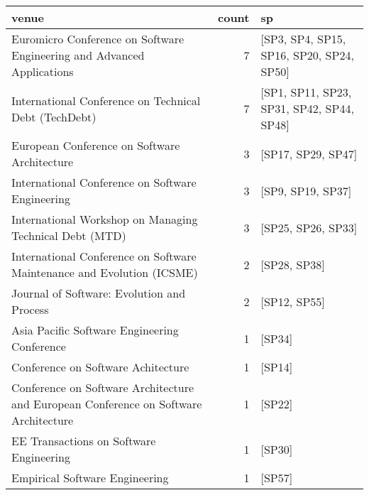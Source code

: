 \begin{tabular}{lrl}
\toprule
                                                                                            venue &  count &                                         sp \\
\midrule
                           Euromicro Conference on Software Engineering and Advanced Applications &      7 &   [SP3, SP4, SP15, SP16, SP20, SP24, SP50] \\
                                            International Conference on Technical Debt (TechDebt) &      7 &  [SP1, SP11, SP23, SP31, SP42, SP44, SP48] \\
                                                     European Conference on Software Architecture &      3 &                         [SP17, SP29, SP47] \\
                                                 International Conference on Software Engineering &      3 &                          [SP9, SP19, SP37] \\
                                          International Workshop on Managing Technical Debt (MTD) &      3 &                         [SP25, SP26, SP33] \\
                           International Conference on Software Maintenance and Evolution (ICSME) &      2 &                               [SP28, SP38] \\
                                                       Journal of Software: Evolution and Process &      2 &                               [SP12, SP55] \\
                                                     Asia Pacific Software Engineering Conference &      1 &                                     [SP34] \\
                                                               Conference on Software Achitecture &      1 &                                     [SP14] \\
             Conference on Software Architecture and European Conference on Software Architecture &      1 &                                     [SP22] \\
                                                          EE Transactions on Software Engineering &      1 &                                     [SP30] \\
                                                                   Empirical Software Engineering &      1 &                                     [SP57] \\

\end{tabular}
